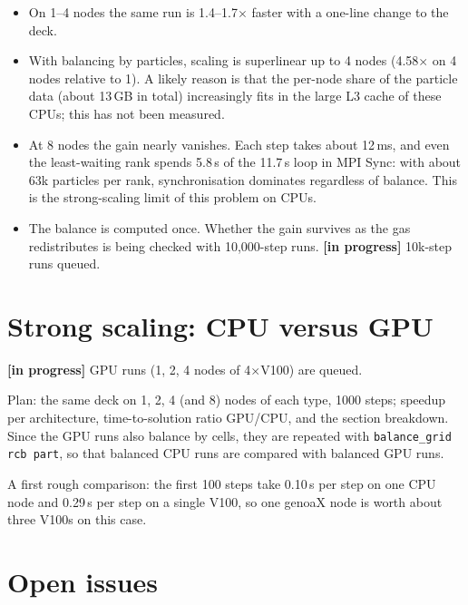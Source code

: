 \documentclass[11pt,a4paper]{article}
\newcommand{\code}[1]{\texttt{#1}}
\newcommand{\todo}[1]{\textcolor{orange!80!black}{\textbf{[in progress]} #1}}
\begin{document}
\begin{itemize}
  \item On 1--4 nodes the same run is 1.4--1.7$\times$ faster with a one-line
        change to the deck.
  \item With balancing by particles, scaling is superlinear up to 4 nodes
        (4.58$\times$ on 4 nodes relative to 1). A likely reason is that the
        per-node share of the particle data (about 13\,GB in total) increasingly
        fits in the large L3 cache of these CPUs; this has not been measured.
  \item At 8 nodes the gain nearly vanishes. Each step takes about 12\,ms, and
        even the least-waiting rank spends 5.8\,s of the 11.7\,s loop in MPI
        Sync: with about 63k particles per rank, synchronisation dominates
        regardless of balance. This is the strong-scaling limit of this problem
        on CPUs.
  \item The balance is computed once. Whether the gain survives as the gas
        redistributes is being checked with 10,000-step runs.
        \todo{10k-step runs queued.}
\end{itemize}

\section{Strong scaling: CPU versus GPU}

\todo{GPU runs (1, 2, 4 nodes of 4$\times$V100) are queued.}

Plan: the same deck on 1, 2, 4 (and 8) nodes of each type, 1000 steps; speedup
per architecture, time-to-solution ratio GPU/CPU, and the section breakdown.
Since the GPU runs also balance by cells, they are repeated with
\code{balance\_grid rcb part}, so that balanced CPU runs are compared with
balanced GPU runs.

A first rough comparison: the first 100 steps take 0.10\,s per step on one CPU
node and 0.29\,s per step on a single V100, so one genoaX node is worth about
three V100s on this case.

\section{Open issues}
\label{sec:open}
\end{document}
